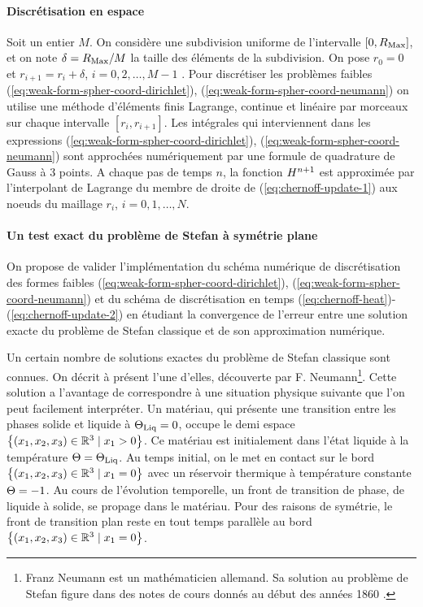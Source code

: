 \paragraph{Discrétisation en espace}
Soit un entier $M$. On considère une subdivision uniforme de
l'intervalle $[0, R_\mathrm{Max}]$, et on note $\delta = R_\mathrm{Max}/M$ la taille des
éléments de la subdivision. On pose $r_0 = 0$ et $r_{i+1} = r_i +
\delta$, $i = 0,2,\dots, M-1$ . Pour discrétiser les problèmes faibles
(\ref{eq:weak-form-spher-coord-dirichlet}),
(\ref{eq:weak-form-spher-coord-neumann}) on utilise une méthode
d'éléments finis Lagrange, continue et linéaire par morceaux sur
chaque intervalle $[r_i, r_{i+1}]$. Les intégrales qui interviennent
dans les expressions (\ref{eq:weak-form-spher-coord-dirichlet}),
(\ref{eq:weak-form-spher-coord-neumann}) sont approchées numériquement
par une formule de quadrature de Gauss à 3 points.
A chaque pas de temps $n$, la fonction $H^{n+1}$ est
approximée par l'interpolant de Lagrange du membre de droite de
(\ref{eq:chernoff-update-1}) aux noeuds du maillage $r_i$, $i =
0,1,\dots, N$.

\paragraph{Un test exact du problème de Stefan à symétrie plane}
On propose de valider l'implémentation du schéma numérique de
discrétisation des formes faibles
(\ref{eq:weak-form-spher-coord-dirichlet}),
(\ref{eq:weak-form-spher-coord-neumann}) et du schéma de
discrétisation en temps
(\ref{eq:chernoff-heat})-(\ref{eq:chernoff-update-2}) en étudiant la
convergence de l'erreur entre une solution exacte du problème de
Stefan classique et de son approximation numérique.

Un certain nombre de solutions exactes du problème de Stefan classique
sont connues. On décrit à présent l'une d'elles, découverte par
F. Neumann\footnote{Franz Neumann est un mathématicien allemand. Sa
  solution au problème de Stefan figure dans des notes de cours donnés
  au début des années 1860 \cite{HillStefanProblems}.}. Cette solution
a l'avantage de correspondre à une situation physique suivante que
l'on peut facilement interpréter.  Un matériau, qui présente une
transition entre les phases solide et liquide à $\Theta_\text{Liq} = 0$, occupe le
demi espace $\left\{ (x_1, x_2, x_3)\in \mathbb R^3 \mid x_1 >
  0 \right\}$. Ce matériau est initialement dans l'état liquide à la
température $\Theta = \Theta_\text{Liq}$. Au temps initial, on le met en
contact sur le bord $\left\{ (x_1, x_2, x_3)\in\mathbb R^3 \mid x_1 =
  0 \right\}$ avec un réservoir thermique à température constante
$\Theta = -1$. Au cours de l'évolution temporelle, un front de
transition de phase, de liquide à solide, se propage dans le
matériau. Pour des raisons de symétrie, le front de transition plan reste
en tout temps parallèle au bord $\left\{ (x_1, x_2, x_3)\in\mathbb
  R^3 \mid x_1 = 0 \right\}$.

